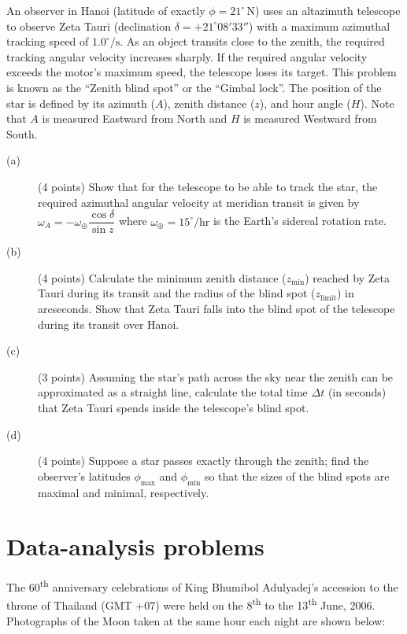 An observer in Hanoi (latitude of exactly $\phi = 21^\circ\,\mathrm{N}$) uses
an altazimuth telescope to observe Zeta Tauri (declination
$\delta = +21^\circ 08' 33''$) with a maximum azimuthal tracking speed of
$1.0^\circ/\mathrm{s}$. As an object transits close to the zenith, the
required tracking angular velocity increases sharply. If the required angular
velocity exceeds the motor's maximum speed, the telescope loses its target.
This problem is known as the ``Zenith blind spot'' or the ``Gimbal lock''. The
position of the star is defined by its azimuth ($A$), zenith distance ($z$),
and hour angle ($H$). Note that $A$ is measured Eastward from North and $H$ is
measured Westward from South.

\begin{description}
\item[(a)] (4 points) Show that for the telescope to be able to track the
  star, the required azimuthal angular velocity at meridian transit is given
  by $\omega_A = -\omega_\oplus \dfrac{\cos\delta}{\sin z}$ where
  $\omega_\oplus = 15^\circ/\mathrm{hr}$ is the Earth's sidereal rotation
  rate.
\item[(b)] (4 points) Calculate the minimum zenith distance
  ($z_{\mathrm{min}}$) reached by Zeta Tauri during its transit and the radius
  of the blind spot ($z_{\mathrm{limit}}$) in arcseconds. Show that Zeta Tauri
  falls into the blind spot of the telescope during its transit over Hanoi.
\item[(c)] (3 points) Assuming the star's path across the sky near the zenith
  can be approximated as a straight line, calculate the total time $\Delta t$
  (in seconds) that Zeta Tauri spends inside the telescope's blind spot.
\item[(d)] (4 points) Suppose a star passes exactly through the zenith; find
  the observer's latitudes $\phi_{\mathrm{max}}$ and $\phi_{\mathrm{min}}$ so
  that the sizes of the blind spots are maximal and minimal, respectively.
\end{description}

\section*{Data-analysis problems}

The 60\textsuperscript{th} anniversary celebrations of King Bhumibol
Adulyadej's accession to the throne of Thailand (GMT +07) were held on the
8\textsuperscript{th} to the 13\textsuperscript{th} June, 2006. Photographs of
the Moon taken at the same hour each night are shown below:

